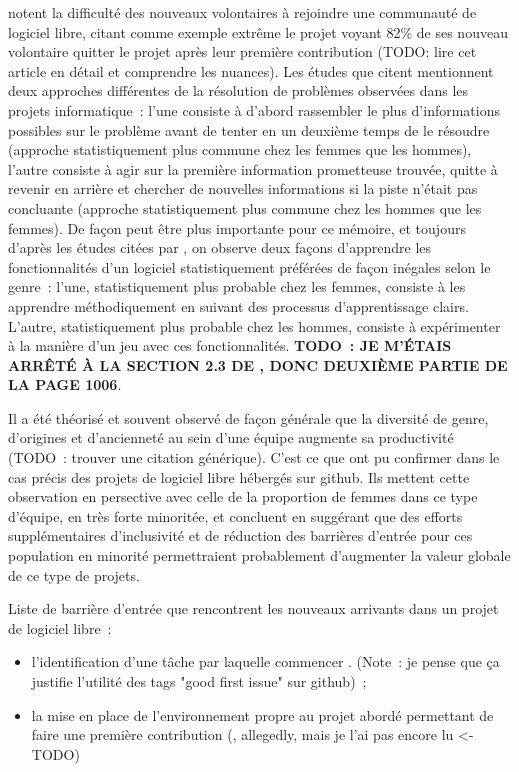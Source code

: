  notent la difficulté des nouveaux volontaires à rejoindre une communauté de
logiciel libre, citant comme exemple extrême le projet  voyant 82\% de ses nouveau
volontaire quitter le projet après leur première contribution  (TODO: lire
cet article en détail et comprendre les nuances). Les études que \textcite[p.~1005]{barriers-2018} citent
mentionnent deux approches différentes de la résolution de problèmes observées dans les projets informatique :
l'une consiste à d'abord rassembler le plus d'informations possibles sur le problème avant de tenter en un
deuxième temps de le résoudre (approche statistiquement plus commune chez les femmes que les hommes), l'autre
consiste à agir sur la première information prometteuse trouvée, quitte à revenir en arrière et chercher de
nouvelles informations si la piste n'était pas concluante (approche statistiquement plus commune chez les
hommes que les femmes). De façon peut être plus importante pour ce mémoire, et toujours d'après les études
citées par \textcite[p.~1005]{barriers-2018}, on observe deux façons d'apprendre les fonctionnalités d'un
logiciel statistiquement préférées de façon inégales selon le genre : l'une, statistiquement plus probable
chez les femmes, consiste à les apprendre méthodiquement en suivant des processus d'apprentissage clairs.
L'autre, statistiquement plus probable chez les hommes, consiste à expérimenter à la manière d'un jeu avec ces
fonctionnalités. \textbf{TODO : JE M'ÉTAIS ARRÊTÉ À LA SECTION 2.3 DE \textcite{barriers-2018}, DONC DEUXIÈME
PARTIE DE LA PAGE 1006}.

Il a été théorisé et souvent observé de façon générale que la diversité de genre, d'origines et d'ancienneté
au sein d'une équipe augmente sa productivité (TODO : trouver une citation générique). C'est ce que
 ont pu confirmer dans le cas précis des projets de logiciel libre hébergés sur
\gls{github}. Ils mettent cette observation en persective avec celle de la proportion de
femmes dans ce type d'équipe, en très forte minoritée, et concluent en suggérant que des efforts
supplémentaires d'inclusivité et de réduction des barrières d'entrée pour ces population en minorité
permettraient probablement d'augmenter la valeur globale de ce type de projets.

Liste de barrière d'entrée que rencontrent les nouveaux arrivants dans un projet de logiciel libre :

\begin{itemize}
    \item l'identification d'une tâche par laquelle commencer . (Note : je
        pense que ça justifie l'utilité des tags "good first issue" sur \gls{github}) ;
    \item la mise en place de l'environnement propre au projet abordé permettant de faire une première
        contribution (, allegedly, mais je l'ai pas encore lu <- TODO)
\end{itemize}

